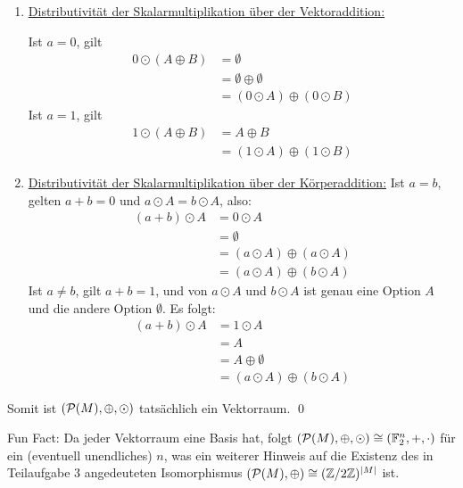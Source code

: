 \documentclass{article}
\begin{document}
\begin{enumerate}
\begin{enumerate}
		Seien $a,b \in \bF_2$ und $A \in \cP(M)$. Ist $a = 0$, gilt:
		\begin{align*}
			a \odot (b \odot A) &= 0 \odot (b \odot A) = \emptyset\\
			(a \cdot b) \odot A &= 0 \odot A = \emptyset
		\end{align*}
		Ist $b = 0$, gilt:
		\begin{align*}
			a \odot (b \odot A) &= a \odot (0 \odot A) = a \odot \emptyset = \emptyset\\
			(a \cdot b) \odot A &= 0 \odot A = \emptyset
		\end{align*}
		Ist $a = b = 1$, gilt:
		\begin{align*}
			a \odot (b \odot A) &= 1 \odot (1 \odot A) = 1 \odot A = A\\
			(a \cdot b) \odot A &= 1 \odot A = A
		\end{align*}
		\item \ul{Distributivität der Skalarmultiplikation über der Vektoraddition:}
		
		Ist $a = 0$, gilt
		\begin{align*}
			0 \odot (A \oplus B) 
			&= \emptyset\\ 
			&= \emptyset \oplus \emptyset\\ 
			&= (0 \odot A) \oplus (0 \odot B)
		\end{align*}
		Ist $a = 1$, gilt
		\begin{align*}
			1 \odot (A \oplus B)
			&= A \oplus B\\
			&= (1 \odot A) \oplus (1 \odot B)
		\end{align*}
		\item \ul{Distributivität der Skalarmultiplikation über der Körperaddition:}
		Ist $a = b$, gelten $a + b = 0$ und $a \odot A = b \odot A$, also:
		\begin{align*}
			(a + b) \odot A
			&= 0 \odot A\\
			&= \emptyset\\
			&= (a \odot A) \oplus (a \odot A)\\
			&= (a \odot A) \oplus (b \odot A)
		\end{align*}
		Ist $a \neq b$, gilt $a + b = 1$, und von $a \odot A$ und $b \odot A$ ist genau eine Option $A$ und die andere Option $\emptyset$. Es folgt:
		\begin{align*}
			(a + b) \odot A
			&= 1 \odot A\\
			&= A\\
			&= A \oplus \emptyset\\
			&= (a \odot A) \oplus (b \odot A)
		\end{align*}
	\end{enumerate}
	Somit ist $(\mathcal{P}(M), \oplus, \odot)$ tatsächlich ein Vektorraum. \qed
	
	Fun Fact: Da jeder Vektorraum eine Basis hat, folgt $(\mathcal{P}(M), \oplus, \odot) \cong (\mathbb{F}_2^n, +, \cdot)$ für ein (eventuell unendliches) $n$, was ein weiterer Hinweis auf die Existenz des in Teilaufgabe 3 angedeuteten Isomorphismus $(\mathcal{P}(M), \oplus) \cong (\mathbb{Z}/2\mathbb{Z})^{|M|}$ ist.
\end{enumerate}
\end{document}
